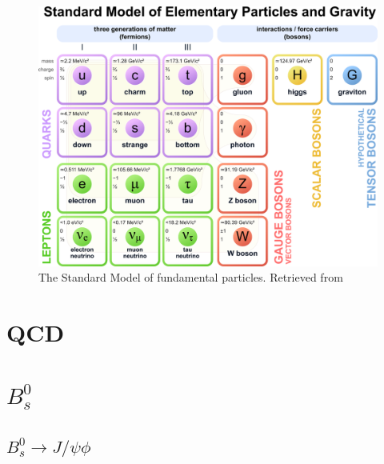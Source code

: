 \begin{figure}[htp!]
	\centering
	\includegraphics[scale=0.34]{MainContent/Figs/SM.eps}
	\caption{The Standard Model of fundamental particles. Retrieved from}
	\label{fig:sm}
\end{figure}

\section{QCD}
\section{$B^0_s$}
\subsection{$B^0_s \to J/\psi\phi$}

